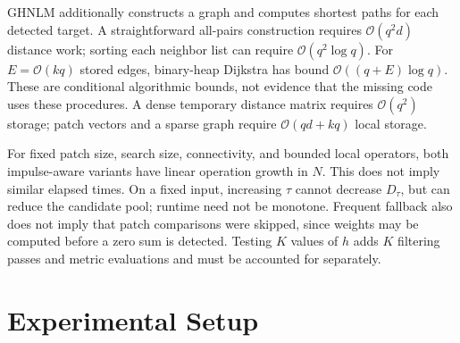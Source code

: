 \documentclass[pdflatex,iicol,sn-mathphys-num]{sn-jnl}
\newif\ifshowportuguese
\newcommand{\pt}[1]{\ifshowportuguese\par\begingroup\small\color{blue!55!black}\noindent\textbf{PT: }#1\par\endgroup\fi}
\begin{document}
GHNLM additionally constructs a graph and computes shortest paths for each detected target. A straightforward all-pairs construction requires $\mathcal{O}(q^2d)$ distance work; sorting each neighbor list can require $\mathcal{O}(q^2\log q)$. For $E=\mathcal{O}(kq)$ stored edges, binary-heap Dijkstra has bound $\mathcal{O}((q+E)\log q)$. These are conditional algorithmic bounds, not evidence that the missing code uses these procedures. A dense temporary distance matrix requires $\mathcal{O}(q^2)$ storage; patch vectors and a sparse graph require $\mathcal{O}(qd+kq)$ local storage.
\pt{O GHNLM adicionalmente constrói um grafo e calcula caminhos mínimos para cada alvo detectado. Uma construção direta com todos os pares exige trabalho $\mathcal{O}(q^2d)$ para distâncias; ordenar cada lista de vizinhos pode exigir $\mathcal{O}(q^2\log q)$. Para $E=\mathcal{O}(kq)$ arestas armazenadas, Dijkstra com heap binário tem limite $\mathcal{O}((q+E)\log q)$. Esses são limites algorítmicos condicionais, não evidência de que o código ausente use esses procedimentos. Uma matriz temporária densa de distâncias exige armazenamento $\mathcal{O}(q^2)$; os vetores de patches e um grafo esparso exigem armazenamento local $\mathcal{O}(qd+kq)$.}

For fixed patch size, search size, connectivity, and bounded local operators, both impulse-aware variants have linear operation growth in $N$. This does not imply similar elapsed times. On a fixed input, increasing $\tau$ cannot decrease $D_\tau$, but can reduce the candidate pool; runtime need not be monotone. Frequent fallback also does not imply that patch comparisons were skipped, since weights may be computed before a zero sum is detected. Testing $K$ values of $h$ adds $K$ filtering passes and metric evaluations and must be accounted for separately.
\pt{Para tamanho de patch, tamanho de busca, conectividade e operadores locais limitados e fixos, ambas as variantes orientadas a impulsos apresentam crescimento linear de operações em $N$. Isso não implica tempos semelhantes. Em uma entrada fixa, aumentar $\tau$ não pode diminuir $D_\tau$, mas pode reduzir o conjunto de candidatos; o tempo não precisa ser monótono. Fallback frequente também não implica que comparações de patches foram omitidas, pois os pesos podem ser calculados antes da detecção de soma nula. Testar $K$ valores de $h$ acrescenta $K$ passagens de filtragem e avaliações de métricas e precisa ser contabilizado separadamente.}


\section{Experimental Setup}
\label{sec:experiments}
\end{document}
